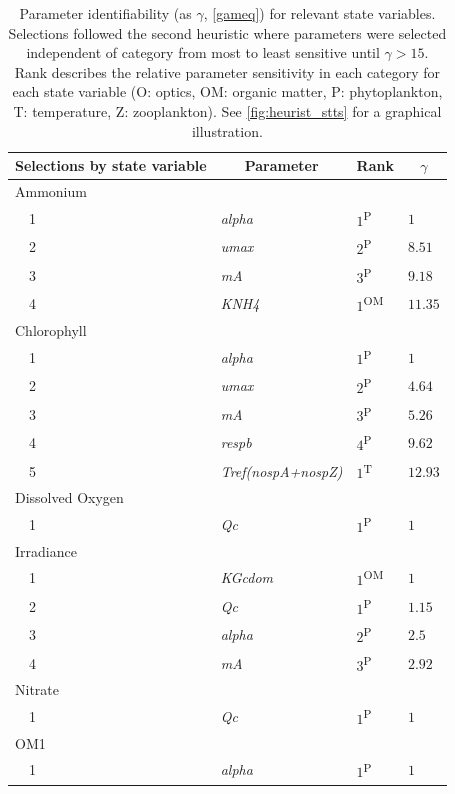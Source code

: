 \documentclass[letterpaper,12pt,oneside]{article}\usepackage[]{graphicx}\usepackage[]{color}
\begin{document}
\begin{table}[!tbp]
{\footnotesize
\caption{Parameter identifiability (as $\gamma$, \cref{gameq}) for relevant state variables.  Selections followed the second heuristic where parameters were selected independent of category from most to least sensitive until $\gamma > 15$.  Rank describes the relative parameter sensitivity in each category for each state variable (O: optics, OM: organic matter, P: phytoplankton, T: temperature, Z: zooplankton). See \cref{fig:heurist_stts} for a graphical illustration.\label{tab:heurist2}} 
\begin{center}
\begin{tabular}{llll}
\hline\hline
\multicolumn{1}{l}{Selections by state variable}&\multicolumn{1}{c}{Parameter}&\multicolumn{1}{c}{Rank}&\multicolumn{1}{c}{$\gamma$}\tabularnewline
\hline
{Ammonium}&&&\tabularnewline
~~1&\footnotesize{\textit{alpha}}&$1$\textsuperscript{P}&$1$\tabularnewline
~~2&\footnotesize{\textit{umax}}&$2$\textsuperscript{P}&$8.51$\tabularnewline
~~3&\footnotesize{\textit{mA}}&$3$\textsuperscript{P}&$9.18$\tabularnewline
~~4&\footnotesize{\textit{KNH4}}&$1$\textsuperscript{OM}&$11.35$\tabularnewline
\hline
{Chlorophyll}&&&\tabularnewline
~~1&\footnotesize{\textit{alpha}}&$1$\textsuperscript{P}&$1$\tabularnewline
~~2&\footnotesize{\textit{umax}}&$2$\textsuperscript{P}&$4.64$\tabularnewline
~~3&\footnotesize{\textit{mA}}&$3$\textsuperscript{P}&$5.26$\tabularnewline
~~4&\footnotesize{\textit{respb}}&$4$\textsuperscript{P}&$9.62$\tabularnewline
~~5&\footnotesize{\textit{Tref(nospA+nospZ)}}&$1$\textsuperscript{T}&$12.93$\tabularnewline
\hline
{Dissolved Oxygen}&&&\tabularnewline
~~1&\footnotesize{\textit{Qc}}&$1$\textsuperscript{P}&$1$\tabularnewline
\hline
{Irradiance}&&&\tabularnewline
~~1&\footnotesize{\textit{KGcdom}}&$1$\textsuperscript{OM}&$1$\tabularnewline
~~2&\footnotesize{\textit{Qc}}&$1$\textsuperscript{P}&$1.15$\tabularnewline
~~3&\footnotesize{\textit{alpha}}&$2$\textsuperscript{P}&$2.5$\tabularnewline
~~4&\footnotesize{\textit{mA}}&$3$\textsuperscript{P}&$2.92$\tabularnewline
\hline
{Nitrate}&&&\tabularnewline
~~1&\footnotesize{\textit{Qc}}&$1$\textsuperscript{P}&$1$\tabularnewline
\hline
{OM1}&&&\tabularnewline
~~1&\footnotesize{\textit{alpha}}&$1$\textsuperscript{P}&$1$\tabularnewline

\end{tabular}
\end{center}}
\end{table}
\end{document}
